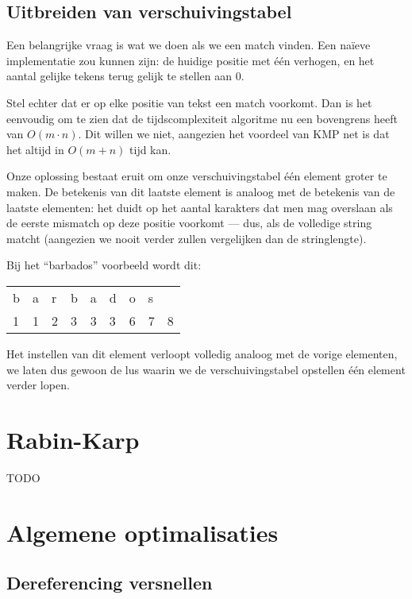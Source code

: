 \documentclass[a4paper,11pt]{article}
\begin{document}
\subsection{Uitbreiden van verschuivingstabel}

Een belangrijke vraag is wat we doen als we een match vinden. Een na\"ieve
implementatie zou kunnen zijn: de huidige positie met \'e\'en verhogen, en het
aantal gelijke tekens terug gelijk te stellen aan 0.

Stel echter dat er op elke positie van tekst een match voorkomt. Dan is het
eenvoudig om te zien dat de tijdscomplexiteit algoritme nu een bovengrens heeft
van $O(m \cdot n)$. Dit willen we niet, aangezien het voordeel van KMP net is
dat het altijd in $O(m + n)$ tijd kan.

Onze oplossing bestaat eruit om onze verschuivingstabel \'e\'en element groter
te maken. De betekenis van dit laatste element is analoog met de betekenis van
de laatste elementen: het duidt op het aantal karakters dat men mag overslaan
als de eerste mismatch op deze positie voorkomt — dus, als de volledige string
matcht (aangezien we nooit verder zullen vergelijken dan de stringlengte).

Bij het “barbados” voorbeeld wordt dit:

\begin{center}
\begin{tabular}{lllllllll}
b & a & r & b & a & d & o & s &   \\
1 & 1 & 2 & 3 & 3 & 3 & 6 & 7 & 8 \\
\end{tabular}
\end{center}

Het instellen van dit element verloopt volledig analoog met de vorige elementen,
we laten dus gewoon de lus waarin we de verschuivingstabel opstellen \'e\'en
element verder lopen.

\section{Rabin-Karp}

TODO

\section{Algemene optimalisaties}

\subsection{Dereferencing versnellen}
\end{document}
